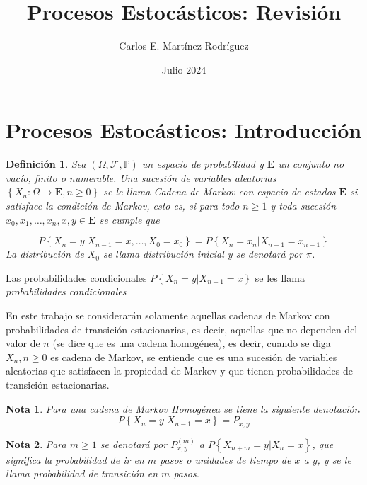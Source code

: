 \documentclass{article}
\title{Procesos Estoc\'asticos: Revisi\'on}
\author{Carlos E. Martínez-Rodríguez}
\date{Julio 2024}
\newtheorem{Def}{Definición}
\newtheorem{Note}{Nota}
\newcommand{\prob}{\mathbb{P}}
\begin{document}
\maketitle

\tableofcontents

\section{Procesos Estocásticos: Introducción}

\begin{Def}
Sea $\left(\Omega,\mathcal{F},\prob\right)$ un espacio de probabilidad y $\mathbf{E}$ un conjunto no vacío, finito o numerable. Una sucesión de variables aleatorias $\left\{X_{n}:\Omega\rightarrow\mathbf{E},n\geq0\right\}$ se le llama \textit{Cadena de Markov} con espacio de estados $\mathbf{E}$ si satisface la condición de Markov, esto es, si para todo $n\geq1$ y toda sucesión $x_{0},x_{1},\ldots,x_{n},x,y\in\mathbf{E}$ se cumple que 

\begin{equation}
P\left\{X_{n}=y|X_{n-1}=x,\ldots,X_{0}=x_{0}\right\}=P\left\{X_{n}=x_{n}|X_{n-1}=x_{n-1}\right\}
\end{equation}
La distribución de $X_{0}$ se llama distribución inicial y se denotará por $\pi$.
\end{Def}

Las probabilidades condicionales $P\left\{X_{n}=y|X_{n-1}=x\right\}$ se les llama \textit{probabilidades condicionales}


En este trabajo se considerarán solamente aquellas cadenas de Markov con probabilidades de transición estacionarias, es decir, aquellas que no dependen del valor de $n$ (se dice que es una cadena homogénea), es decir, cuando se diga $X_{n},n\geq0$ es cadena de Markov, se entiende que es una sucesión de variables aleatorias que satisfacen la propiedad de Markov y que tienen probabilidades de transición estacionarias.

\begin{Note}
Para una cadena de Markov Homogénea se tiene la siguiente denotación
\begin{equation}
P\left\{X_{n}=y|X_{n-1}=x\right\}=P_{x,y}
\end{equation}
\end{Note}

\begin{Note}
Para $m\geq1$ se denotará por $P^{(m)}_{x,y}$ a $P\left\{X_{n+m}=y|X_{n}=x\right\}$, que significa la probabilidad de ir en $m$ pasos o unidades de tiempo de $x$ a $y$, y se le llama \textit{probabilidad de transición en $m$ pasos}.
\end{Note}
\end{document}
